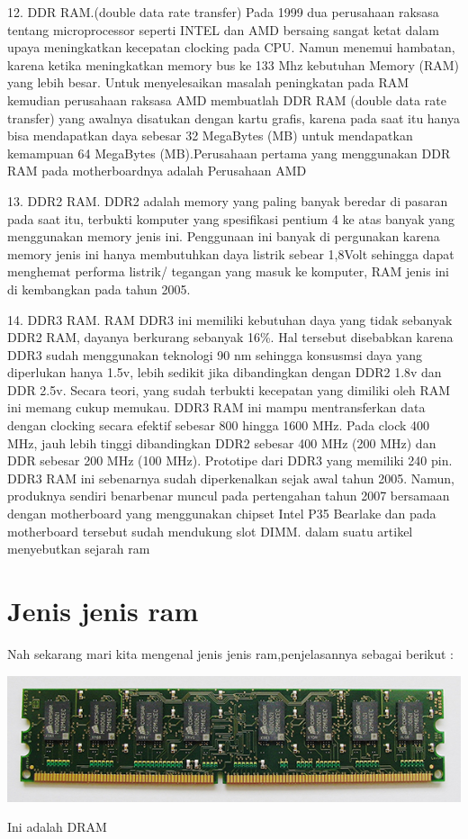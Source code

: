 12. DDR RAM.(double data rate transfer) Pada 1999 dua perusahaan raksasa tentang microprocessor seperti INTEL dan AMD bersaing sangat ketat dalam upaya meningkatkan kecepatan clocking pada CPU. Namun menemui hambatan, karena ketika meningkatkan memory bus ke 133 Mhz kebutuhan Memory (RAM) yang lebih besar. Untuk menyelesaikan masalah peningkatan pada RAM kemudian perusahaan raksasa AMD membuatlah DDR RAM (double data rate transfer) yang awalnya disatukan dengan kartu grafis, karena pada saat itu hanya bisa mendapatkan daya sebesar 32 MegaBytes (MB) untuk mendapatkan kemampuan 64 MegaBytes (MB).Perusahaan pertama yang menggunakan DDR RAM pada motherboardnya adalah Perusahaan AMD

13. DDR2 RAM. DDR2 adalah memory yang paling banyak beredar di pasaran pada saat itu, terbukti komputer yang spesifikasi pentium 4 ke atas banyak yang menggunakan memory jenis ini. Penggunaan ini banyak di pergunakan karena memory jenis ini hanya membutuhkan daya listrik sebear 1,8Volt sehingga dapat menghemat performa listrik/ tegangan yang masuk ke komputer, RAM jenis ini di kembangkan pada tahun 2005.

14. DDR3 RAM. RAM DDR3 ini memiliki kebutuhan daya yang tidak sebanyak DDR2 RAM, dayanya berkurang sebanyak 16\%. Hal tersebut disebabkan karena DDR3 sudah menggunakan teknologi 90 nm sehingga konsusmsi daya yang diperlukan hanya 1.5v, lebih sedikit jika dibandingkan dengan DDR2 1.8v dan DDR 2.5v. Secara teori, yang sudah terbukti kecepatan yang dimiliki oleh RAM ini memang cukup memukau. DDR3 RAM ini mampu mentransferkan data dengan clocking secara efektif sebesar 800 hingga 1600 MHz. Pada clock 400 MHz, jauh lebih tinggi dibandingkan DDR2 sebesar 400 MHz (200 MHz) dan DDR sebesar 200 MHz (100 MHz). Prototipe dari DDR3 yang memiliki 240 pin. DDR3 RAM ini sebenarnya sudah diperkenalkan sejak awal tahun 2005. Namun, produknya sendiri benar\-benar muncul pada pertengahan tahun 2007 bersamaan dengan motherboard yang menggunakan chipset Intel P35 Bearlake dan pada motherboard tersebut sudah mendukung slot DIMM.
dalam suatu artikel menyebutkan sejarah ram \cite{kan1995random}

\section{Jenis \- jenis ram}
Nah sekarang mari kita mengenal jenis \- jenis ram,penjelasannya sebagai berikut :


  \begin{figures}[ht]
  \centerline{\includegraphics[width=1\textwidth]{figures/DRAM.jpg}}
  \caption{Ini adalah DRAM}
  \label{DRAM}
  \end{figures}

